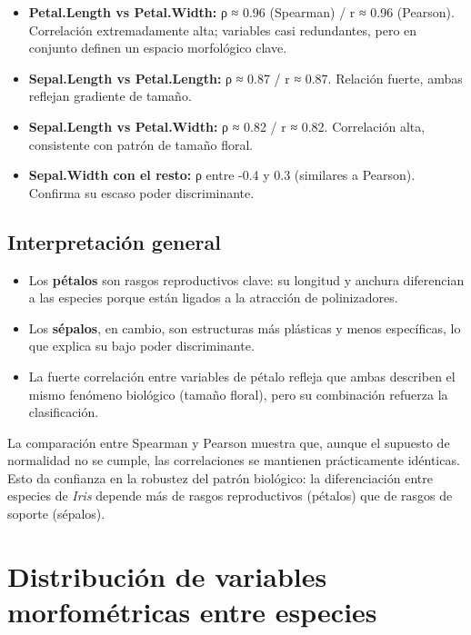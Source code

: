 \documentclass[
  spanish,
  11pt,
  a4paper,
  DIV=11,
  numbers=noendperiod]{scrartcl}
\providecommand{\tightlist}{%
  \setlength{\itemsep}{0pt}\setlength{\parskip}{0pt}}
\begin{document}
\begin{itemize}
\tightlist
\item
  \textbf{Petal.Length vs Petal.Width:} ρ ≈ 0.96 (Spearman) / r ≈ 0.96
  (Pearson). Correlación extremadamente alta; variables casi
  redundantes, pero en conjunto definen un espacio morfológico clave.\\
\item
  \textbf{Sepal.Length vs Petal.Length:} ρ ≈ 0.87 / r ≈ 0.87. Relación
  fuerte, ambas reflejan gradiente de tamaño.\\
\item
  \textbf{Sepal.Length vs Petal.Width:} ρ ≈ 0.82 / r ≈ 0.82. Correlación
  alta, consistente con patrón de tamaño floral.\\
\item
  \textbf{Sepal.Width con el resto:} ρ entre -0.4 y 0.3 (similares a
  Pearson). Confirma su escaso poder discriminante.
\end{itemize}

\subsection{Interpretación general}\label{interpretaciuxf3n-general}

\begin{itemize}
\item
  Los \textbf{pétalos} son rasgos reproductivos clave: su longitud y
  anchura diferencian a las especies porque están ligados a la atracción
  de polinizadores.
\item
  Los \textbf{sépalos}, en cambio, son estructuras más plásticas y menos
  específicas, lo que explica su bajo poder discriminante.
\item
  La fuerte correlación entre variables de pétalo refleja que ambas
  describen el mismo fenómeno biológico (tamaño floral), pero su
  combinación refuerza la clasificación.
\end{itemize}

La comparación entre Spearman y Pearson muestra que, aunque el supuesto
de normalidad no se cumple, las correlaciones se mantienen prácticamente
idénticas. Esto da confianza en la robustez del patrón biológico: la
diferenciación entre especies de \emph{Iris} depende más de rasgos
reproductivos (pétalos) que de rasgos de soporte (sépalos).

\section{Distribución de variables morfométricas entre
especies}\label{distribuciuxf3n-de-variables-morfomuxe9tricas-entre-especies}
\end{document}
